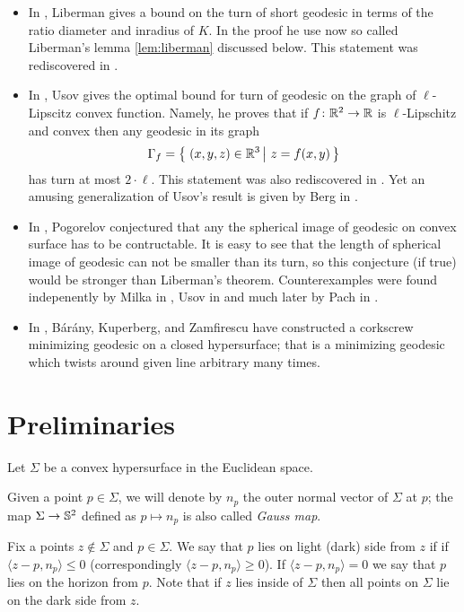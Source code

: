 \documentclass[a4paper,10pt]{amsart}
\begin{document}
\begin{itemize}
\item In \cite{liberman}, Liberman gives a bound on the turn of short geodesic in terms of the ratio diameter and inradius of $K$.
In the proof he use now so called Liberman's lemma \ref{lem:liberman} discussed below.
This statement was rediscovered in \cite{BKZ}.
\item In \cite{usov}, Usov gives the optimal bound for turn of geodesic on the graph of $\ell$-Lipscitz convex function. 
Namely, he proves that if $f\colon\mathbb{R}^2\to\mathbb{R}$ is $\ell$-Lipschitz and convex then any 
geodesic in its graph 
\[\Gamma_f=\set{(x,y,z)\in \RR^3}{z=f(x,y)}\] 
has turn at most $2\cdot \ell$.
This statement was also rediscovered in \cite{BKZ}.
Yet an amusing generalization of Usov's result is given by Berg in \cite{berg}.
\item In \cite{pogorelov}, Pogorelov conjectured that any the spherical image of geodesic on convex surface has to be contructable.
It is easy to see that the length of spherical image of geodesic can not be smaller than its turn, so this conjecture (if true) would be stronger than Liberman's theorem.
Counterexamples were found indepenently by Milka in \cite{milka}, 
Usov in \cite{usov-conj-pog} 
and much later by Pach in \cite{pach}.
\item In \cite{BKZ},
B{\'a}r{\'a}ny,
Kuperberg, 
and Zamfirescu 
have constructed a corkscrew minimizing geodesic on a closed hypersurface;
that is a minimizing geodesic which twists around given line arbitrary many times.
\end{itemize}


\section{Preliminaries}

Let $\Sigma$ be a convex hypersurface in the Euclidean space.

Given a point $p\in \Sigma$, we will denote by $n_p$ the outer normal vector of $\Sigma$ at $p$;
the map $\Sigma\to\mathbb{S}^2$ defined as $p\mapsto n_p$ is also called \emph{Gauss map}.

Fix a points $z\notin\Sigma$ and $p\in \Sigma$.
We say that $p$ lies on light (dark) side from $z$ if 
if $\langle z-p,n_p\rangle\le 0$ (correspondingly $\langle z-p,n_p\rangle\ge 0$).
If $\langle z-p,n_p\rangle= 0$ we say that $p$ lies on the horizon
from $p$.
Note that if $z$ lies inside of $\Sigma$ then all points on $\Sigma$ lie on the dark side from $z$.
\end{document}
